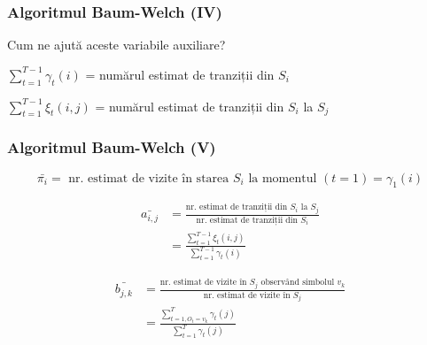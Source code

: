 \begin{frame}
	\frametitle{Algoritmul Baum-Welch (IV)}
	Cum ne ajută aceste variabile auxiliare?
	\vspace*{1em}
	
	\begin{block}{}
	$\displaystyle\sum_{t=1}^{T-1}\gamma_t(i)$ = numărul estimat de tranziții din $S_i$
	\end{block}
	\vspace*{1em}
	\begin{block}{}
	$\displaystyle\sum_{t=1}^{T-1}\xi_t(i,j)$ = numărul estimat de tranziții din $S_i$ la $S_j$
	\end{block}
	
\end{frame}

\begin{frame}[t]
	\frametitle{Algoritmul Baum-Welch (V)}
	\scriptsize {
	\begin{equation}
	\bar{\pi_i} = \mbox{ nr. estimat de vizite în starea } S_i \mbox{ la momentul } (t=1) = \gamma_1(i)
	\end{equation}
	\pause	
	
	\begin{equation}
	\begin{split}
	\bar{a_{i,j}} & = \frac{\mbox{nr. estimat de tranziții din } S_i \mbox{ la } S_j}
							{\mbox{nr. estimat de tranziții din } S_i} \\
				  & = \frac{\displaystyle\sum_{t=1}^{T-1}\xi_t(i,j)}
				   			{\displaystyle\sum_{t=1}^{T-1}\gamma_t(i)}	
	\end{split}
	\end{equation}
	\pause	
	
	\begin{equation}
	\begin{split}
	\bar{b_{j,k}}  & = \frac{\mbox{nr. estimat de vizite în } S_j \mbox{ observând simbolul } v_k}
							{\mbox{nr. estimat de vizite în } S_j} \\
				   & = \frac{\displaystyle\sum_{t=1, O_t = v_k}^{T}\gamma_t(j)}
				   			{\displaystyle\sum_{t=1}^{T}\gamma_t(j)}	
	\end{split}
	\end{equation}	
	}
	
\end{frame}


